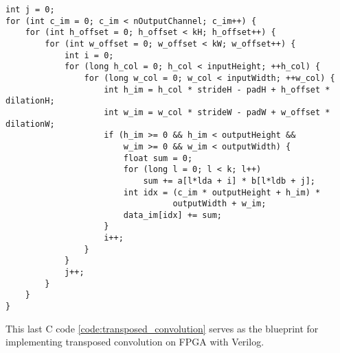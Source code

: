 \begin{code}
\begin{verbatim}
int j = 0;
for (int c_im = 0; c_im < nOutputChannel; c_im++) {
    for (int h_offset = 0; h_offset < kH; h_offset++) {
        for (int w_offset = 0; w_offset < kW; w_offset++) {
            int i = 0;
            for (long h_col = 0; h_col < inputHeight; ++h_col) {
                for (long w_col = 0; w_col < inputWidth; ++w_col) {
                    int h_im = h_col * strideH - padH + h_offset * dilationH;
                    int w_im = w_col * strideW - padW + w_offset * dilationW;
                    if (h_im >= 0 && h_im < outputHeight &&
                        w_im >= 0 && w_im < outputWidth) {
                        float sum = 0;
                        for (long l = 0; l < k; l++)
                            sum += a[l*lda + i] * b[l*ldb + j];
                        int idx = (c_im * outputHeight + h_im) *
                                  outputWidth + w_im;
                        data_im[idx] += sum;
                    }
                    i++;
                }
            }
            j++;
        }
    }
}
\end{verbatim}
\label{code:transposed_convolution}
\end{code}

This last C code \ref{code:transposed_convolution} serves as the blueprint for implementing
transposed convolution on FPGA with Verilog.
\clearpage %

